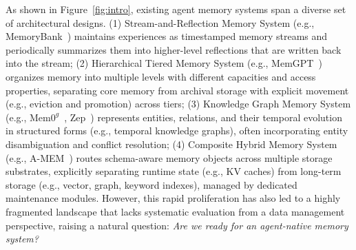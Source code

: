 \documentclass{llmxive}
\begin{document}
As shown in Figure~\ref{fig:intro}, existing agent memory systems span a diverse set of architectural designs. %
\textsf{(1) Stream-and-Reflection Memory System} (e.g., MemoryBank~\cite{memorybank}) maintains experiences as timestamped memory streams and periodically summarizes them into higher-level reflections that are written back into the stream; 
\textsf{(2) Hierarchical Tiered Memory System} (e.g., MemGPT~\cite{packer2023memgpt}) organizes memory into multiple levels with different capacities and access properties, separating core memory from archival storage with explicit movement (e.g., eviction and promotion) across tiers; 
\textsf{(3) Knowledge Graph Memory System} (e.g., $\text{Mem0}^g$~\cite{chhikara2025mem0}, Zep~\cite{rasmussen2025zep}) represents entities, relations, and their temporal evolution in structured forms (e.g., temporal knowledge graphs), often incorporating entity disambiguation and conflict resolution; \textsf{(4) Composite Hybrid Memory System} (e.g., A-MEM~\cite{xu2025amem}) routes schema-aware memory objects across multiple storage substrates, explicitly separating runtime state (e.g., KV caches) from long-term storage (e.g., vector, graph, keyword indexes), managed by dedicated maintenance modules. However, this rapid proliferation has also led to a highly fragmented landscape that lacks systematic evaluation from a data management perspective, raising a natural question: \textit{Are we ready for an agent-native memory system?}
\end{document}

